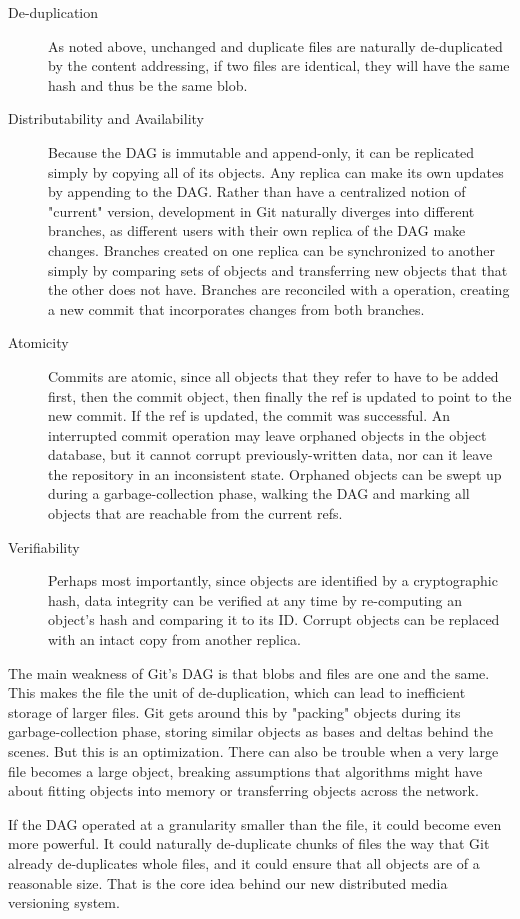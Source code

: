 \begin{description}

    \item[De-duplication] As noted above, unchanged and duplicate files are
        naturally de-duplicated by the content addressing, if two files are
        identical, they will have the same hash and thus be the same blob.

    \item[Distributability and Availability] Because the DAG is immutable and
        append-only, it can be replicated simply by copying all of its objects.
        Any replica can make its own updates by appending to the DAG. Rather
        than have a centralized notion of "current" version, development in Git
        naturally diverges into different branches, as different users with
        their own replica of the DAG make changes. Branches created on one
        replica can be synchronized to another simply by comparing sets of
        objects and transferring new objects that that the other does not have.
        Branches are reconciled with a  operation, creating a new
        commit that incorporates changes from both branches.

    \item[Atomicity] Commits are atomic, since all objects that they refer to
        have to be added first, then the commit object, then finally the ref is
        updated to point to the new commit. If the ref is updated, the commit
        was successful. An interrupted commit operation may leave orphaned
        objects in the object database, but it cannot corrupt previously-written
        data, nor can it leave the repository in an inconsistent state. Orphaned
        objects can be swept up during a garbage-collection phase, walking the
        DAG and marking all objects that are reachable from the current refs.

    \item[Verifiability] Perhaps most importantly, since objects are identified
        by a cryptographic hash, data integrity can be verified at any time by
        re-computing an object's hash and comparing it to its ID. Corrupt
        objects can be replaced with an intact copy from another replica.

\end{description}

The main weakness of Git's DAG is that blobs and files are one and the same.
This makes the file the unit of de-duplication, which can lead to inefficient
storage of larger files. Git gets around this by "packing" objects during its
garbage-collection phase, storing similar objects as bases and deltas behind the
scenes. But this is an optimization. There can also be trouble when a very large
file becomes a large object, breaking assumptions that algorithms might have
about fitting objects into memory or transferring objects across the network.

If the DAG operated at a granularity smaller than the file, it could become even
more powerful. It could naturally de-duplicate chunks of files the way that Git
already de-duplicates whole files, and it could ensure that all objects are of a
reasonable size. That is the core idea behind our new distributed media
versioning system.
